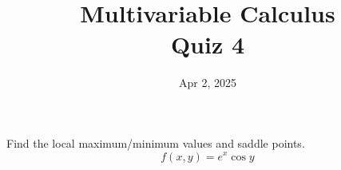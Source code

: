 \documentclass[aspectratio=169]{beamer}
\title{ Multivariable Calculus \\ Quiz 4}
\institute{Fulbright University Vietnam}
\date{Apr 2, 2025}
\begin{document}
\maketitle

\begin{frame}
	Find the local maximum/minimum values and saddle points.
	$$f(x,y) = e^x \cos y$$
\end{frame}
\end{document}
